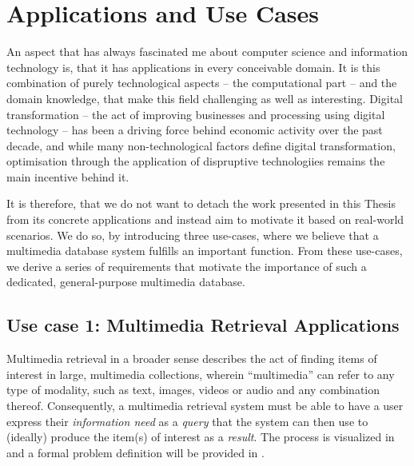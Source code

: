 \chapter{Applications and Use Cases}
\label{chapter:applications}

An aspect that has always fascinated me about computer science and information technology is, that it has applications in every conceivable domain. It is this combination of purely technological aspects -- the computational part -- and the domain knowledge, that make this field challenging as well as interesting. Digital transformation -- the act of improving businesses and processing using digital technology \cite{Vial:2019Understanding} -- has been a driving force behind economic activity over the past decade, and while many non-technological factors define digital transformation, optimisation through the application of dispruptive technologiies remains the main incentive behind it.

It is therefore, that we do not want to detach the work presented in this Thesis from its concrete applications and instead aim to motivate it based on real-world scenarios. We do so, by introducing three use-cases, where we believe that a multimedia database system fulfills an important function. From these use-cases, we derive a series of requirements that motivate the importance of such a dedicated, general-purpose multimedia database.

\section{Use case 1: Multimedia Retrieval Applications}
\label{section:application_retrieval}

Multimedia retrieval in a broader sense describes the act of finding items of interest in large, multimedia collections, wherein ``multimedia'' can refer to any type of modality, such as text, images, videos or audio and any combination thereof. Consequently, a multimedia retrieval system must be able to have a user express their \emph{information need} as a \emph{query} that the system can then use to (ideally) produce the item(s) of interest as a \emph{result}. The process is visualized in  and a formal problem definition will be provided in .

